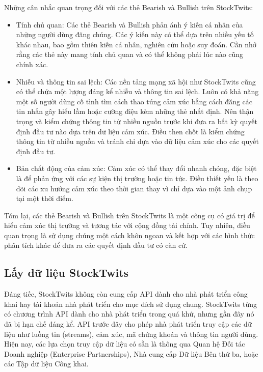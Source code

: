 Những cân nhắc quan trọng đối với các thẻ Bearish và Bullish trên StockTwits:

\begin{itemize}
  \item Tính chủ quan: Các thẻ Bearish và Bullish phản ánh ý kiến cá nhân của những người dùng đăng chúng. Các ý kiến này có thể dựa trên nhiều yếu tố khác nhau, bao gồm thiên kiến cá nhân, nghiên cứu hoặc suy đoán. Cần nhớ rằng các thẻ này mang tính chủ quan và có thể không phải lúc nào cũng chính xác.
  \item Nhiễu và thông tin sai lệch: Các nền tảng mạng xã hội như StockTwits cũng có thể chứa một lượng đáng kể nhiễu và thông tin sai lệch. Luôn có khả năng một số người dùng cố tình tìm cách thao túng cảm xúc bằng cách đăng các tin nhắn gây hiểu lầm hoặc cường điệu kèm những thẻ nhất định. Nên thận trọng và kiểm chứng thông tin từ nhiều nguồn trước khi đưa ra bất kỳ quyết định đầu tư nào dựa trên dữ liệu cảm xúc. Điều then chốt là kiểm chứng thông tin từ nhiều nguồn và tránh chỉ dựa vào dữ liệu cảm xúc cho các quyết định đầu tư.
  \item Bản chất động của cảm xúc: Cảm xúc có thể thay đổi nhanh chóng, đặc biệt là để phản ứng với các sự kiện thị trường hoặc tin tức. Điều thiết yếu là theo dõi các xu hướng cảm xúc theo thời gian thay vì chỉ dựa vào một ảnh chụp tại một thời điểm.
\end{itemize}

Tóm lại, các thẻ Bearish và Bullish trên StockTwits là một công cụ có giá trị để hiểu cảm xúc thị trường và tương tác với cộng đồng tài chính. Tuy nhiên, điều quan trọng là sử dụng chúng một cách khôn ngoan và kết hợp với các hình thức phân tích khác để đưa ra các quyết định đầu tư có căn cứ.

\subsection{Lấy dữ liệu StockTwits}

Đáng tiếc, StockTwits không còn cung cấp API dành cho nhà phát triển công khai hay tài khoản nhà phát triển cho mục đích sử dụng chung. StockTwits từng có chương trình API dành cho nhà phát triển trong quá khứ, nhưng gần đây nó đã bị hạn chế đáng kể. API trước đây cho phép nhà phát triển truy cập các dữ liệu như luồng tin (streams), cảm xúc, mã chứng khoán và thông tin người dùng. Hiện nay, các lựa chọn truy cập dữ liệu có sẵn là thông qua Quan hệ Đối tác Doanh nghiệp (Enterprise Partnerships), Nhà cung cấp Dữ liệu Bên thứ ba, hoặc các Tập dữ liệu Công khai.

